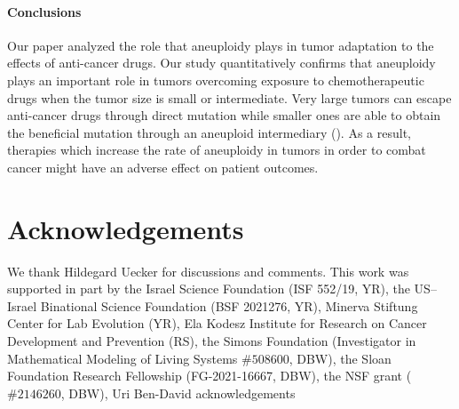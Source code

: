 \documentclass[12pt]{extarticle}
\begin{document}
\paragraph{Conclusions}

Our paper analyzed the role that aneuploidy plays in tumor adaptation to the effects of anti-cancer drugs. Our study quantitatively confirms that aneuploidy plays an important role in tumors overcoming exposure to chemotherapeutic drugs when the tumor size is small or intermediate. Very large tumors can escape anti-cancer drugs through direct mutation while smaller ones are able to obtain the beneficial mutation through an aneuploid intermediary (). As a result, therapies which increase the rate of aneuploidy in tumors in order to combat cancer might have an adverse effect on patient outcomes.

{\small
\section*{Acknowledgements}
We thank Hildegard Uecker for discussions and comments. %
This work was supported in part by
the Israel Science Foundation (ISF 552/19, YR),
the US–Israel Binational Science Foundation (BSF 2021276, YR), 
Minerva Stiftung Center for Lab Evolution (YR), 
Ela Kodesz Institute for Research on Cancer Development and Prevention (RS),
the Simons Foundation (Investigator in Mathematical Modeling of Living Systems $\#508600$, DBW),
the Sloan Foundation Research Fellowship (FG-2021-16667, DBW),
the NSF grant ($\#2146260$, DBW),
{\color{red} Uri Ben-David acknowledgements}


}

\nolinenumbers
%


\end{document}
